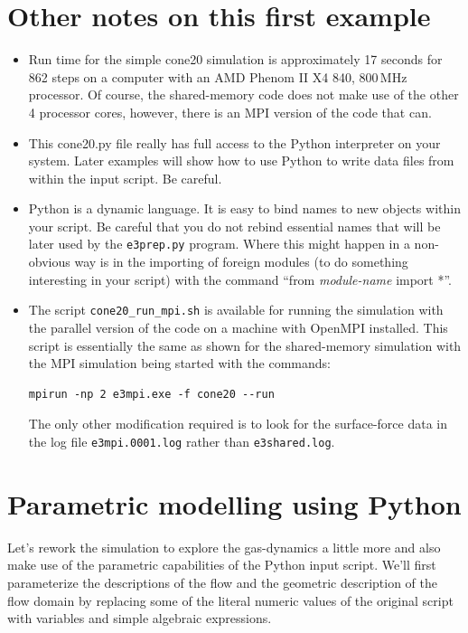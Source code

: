 \section{Other notes on this first example}
\begin{itemize}
\item Run time for the simple cone20 simulation 
      is approximately 17 seconds for 862 steps on a computer with 
      an AMD Phenom II X4 840, 800\,MHz processor.
      Of course, the shared-memory code does not make use of the other 4 processor cores,
      however, there is an MPI version of the code that can.

\item This cone20.py file really has full access to the Python interpreter
      on your system.  Later examples will show how to use Python to write
      data files from within the input script.  Be careful.

\item Python is a dynamic language.
      It is easy to bind names to new objects within your script.
      Be careful that you do not rebind essential names that will be
      later used by the \texttt{e3prep.py} program.
      Where this might happen in a non-obvious way is in the importing
      of foreign modules (to do something interesting in your script)
      with the command ``from \textit{module-name} import *''.

\item The script \texttt{cone20\_run\_mpi.sh} is available for running the simulation
  with the parallel version of the code on a machine with OpenMPI installed.
  This script is essentially the same as shown for the shared-memory simulation
  with the MPI simulation being started with the commands:
\begin{verbatim}
mpirun -np 2 e3mpi.exe -f cone20 --run
\end{verbatim}
  The only other modification required is to look for the surface-force data in the
  log file \texttt{e3mpi.0001.log} rather than \texttt{e3shared.log}.

\end{itemize}


\section{Parametric modelling using Python}
%
Let's rework the simulation to explore the gas-dynamics a little more and also
make use of the parametric capabilities of the Python input script.
We'll first parameterize the descriptions of the flow and the geometric description
of the flow domain by replacing some of the literal numeric values of the original script
with variables and simple algebraic expressions.

